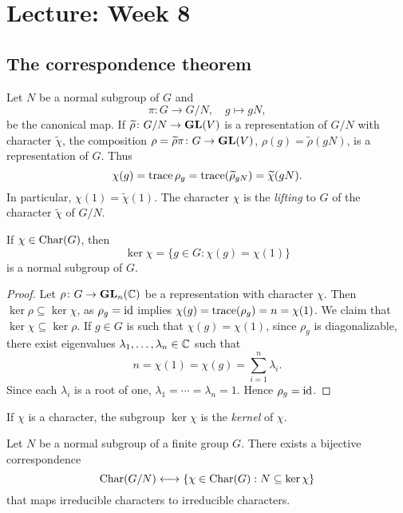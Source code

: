 \section{Lecture: Week 8}

\subsection{The correspondence theorem}

Let $N$ be a normal subgroup of $G$ 
and 
\[
\pi\colon G\to G/N,\quad 
g\mapsto gN,
\]
be the canonical map. 
If $\widetilde{\rho}\colon G/N\to\mathbf{GL}(V)$ 
is a representation of $G/N$ with 
character
$\widetilde{\chi}$, the composition 
$\rho=\widetilde{\rho}\pi\colon G\to \mathbf{GL}(V)$, $\rho(g)=\widetilde{\rho}(gN)$, 
is a representation of $G$. 
Thus
\[
\chi(g)=\operatorname{trace}{\rho_g}=\operatorname{trace}(\widetilde{\rho}_{gN})=\widetilde{\chi}(gN).
\]
In particular, $\chi(1)=\widetilde{\chi}(1)$. The character $\chi$ 
is the \emph{lifting} to $G$ of the character 
$\widetilde{\chi}$ of $G/N$. 

\begin{proposition}
If $\chi\in\operatorname{Char}(G)$, then 
\[
\ker\chi=\{g\in G:\chi(g)=\chi(1)\}
\]
is a normal subgroup of $G$. 
\end{proposition}

\begin{proof}
Let $\rho\colon G\to\mathbf{GL}_n(\mathbb{C})$ be a representation with character $\chi$. Then 
$\ker\rho\subseteq\ker\chi$, as $\rho_g=\operatorname{id}$ implies 
$\chi(g)=\operatorname{trace}(\rho_g)=n=\chi(1)$. We claim that  
$\ker\chi\subseteq\ker\rho$. If $g\in G$ is such that $\chi(g)=\chi(1)$, since 
$\rho_g$ is diagonalizable, there exist eigenvalues $\lambda_1,\dots,\lambda_n\in\mathbb{C}$ such that
\[
n=\chi(1)=\chi(g)=\sum_{i=1}^n\lambda_i.
\]
Since each $\lambda_i$ is a root of one,  
$\lambda_1=\cdots=\lambda_n=1$. Hence $\rho_g=\operatorname{id}$. 
\end{proof}

If $\chi$ is a character, the subgroup $\ker\chi$ 
is the \emph{kernel} of $\chi$. 

\begin{theorem}
\label{thm:correspondence}
Let $N$ be a normal subgroup of a finite group $G$. There exists
a bijective correspondence 
\[
\operatorname{Char}(G/N) \longleftrightarrow \{\chi\in\operatorname{Char}(G): 
N\subseteq\ker\chi\}
\]
that maps irreducible characters to irreducible characters.
\end{theorem}

